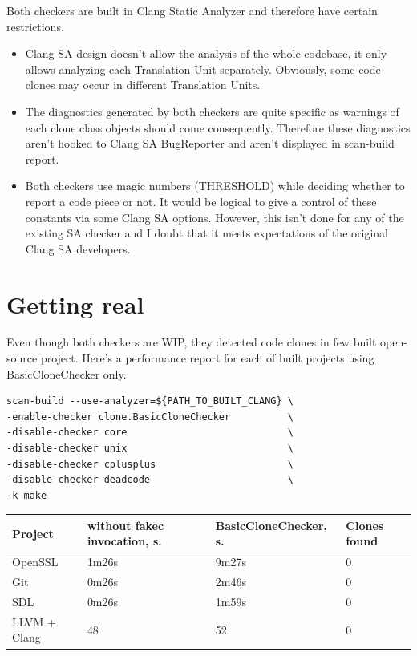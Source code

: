\documentclass[a0,portrait]{a0poster}
\begin{document}
\begin{multicols}{2}
Both checkers are built in Clang Static Analyzer and therefore have certain restrictions.

\begin{itemize}
  \item Clang SA design doesn't allow the analysis of the whole codebase, it only allows
  analyzing each Translation Unit separately. Obviously, some code clones may occur in
  different Translation Units.
  \item The diagnostics generated by both checkers are quite specific as warnings of each
  clone class objects should come consequently. Therefore these diagnostics aren't hooked
  to Clang SA BugReporter and aren't displayed in scan-build report.
  \item Both checkers use magic numbers (THRESHOLD) while deciding whether to report a
  code piece or not. It would be logical to give a control of these constants via some
  Clang SA options. However, this isn't done for any of the existing SA checker and I
  doubt that it meets expectations of the original Clang SA developers.
\end{itemize}


\section*{Getting real}

Even though both checkers are WIP, they detected code clones in few built open-source
project. Here's a performance report for each of built projects using BasicCloneChecker
only.

\begin{lstlisting}[frame=single]
scan-build --use-analyzer=${PATH_TO_BUILT_CLANG} \
-enable-checker clone.BasicCloneChecker          \
-disable-checker core                            \
-disable-checker unix                            \
-disable-checker cplusplus                       \
-disable-checker deadcode                        \
-k make
\end{lstlisting}

\begin{center}\vspace{1cm}
\begin{tabular}{l l l l}
\toprule
\textbf{Project} & \textbf{without fakec invocation, s.} & 
\textbf{BasicCloneChecker, s.} & \textbf{Clones found} \\
\midrule
OpenSSL & 1m26s & 9m27s & 0 \\
Git & 0m26s & 2m46s & 0 \\
SDL & 0m26s & 1m59s & 0 \\
LLVM + Clang & 48 & 52 & 0 \\
\bottomrule
\end{tabular}
\end{center}\vspace{1cm}


\end{multicols}
\end{document}
